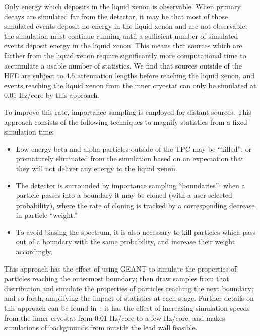 Only energy which deposits in the liquid xenon is observable.  When primary decays are simulated far from the detector, it may be that most of those simulated events deposit no energy in the liquid xenon and are not observable; the simulation must continue running until a sufficient number of simulated events deposit energy in the liquid xenon.  This means that sources which are farther from the liquid xenon require significantly more computational time to accumulate a usable number of statistics.  We find that sources outside of the HFE are subject to $4.5$ attenuation lengths before reaching the liquid xenon, and events reaching the liquid xenon from the inner cryostat can only be simulated at $0.01$ Hz/core by this approach.~\cite{MCDocumentRun2a}

To improve this rate, importance sampling is employed for distant sources.  This approach consists of the following techniques to magnify statistics from a fixed simulation time:
\begin{itemize}
\item Low-energy beta and alpha particles outside of the TPC may be ``killed'', or prematurely eliminated from the simulation based on an expectation that they will not deliver any energy to the liquid xenon.
\item The detector is surrounded by importance sampling ``boundaries'': when a particle passes into a boundary it may be cloned (with a user-selected probability), where the rate of cloning is tracked by a corresponding decrease in particle ``weight.''
\item To avoid biasing the spectrum, it is also necessary to kill particles which pass out of a boundary with the same probability, and increase their weight accordingly.
\end{itemize}
This approach has the effect of using GEANT to simulate the properties of particles reaching the outermost boundary; then draw samples from that distribution and simulate the properties of particles reaching the next boundary; and so forth, amplifying the impact of statistics at each stage.  Further details on this approach can be found in~\cite{Dressel:642987}; it has the effect of increasing simulation speeds from the inner cryostat from $0.01$ Hz/core to a few Hz/core, and makes simulations of backgrounds from outside the lead wall feasible.~\cite{MCDocumentRun2a}

